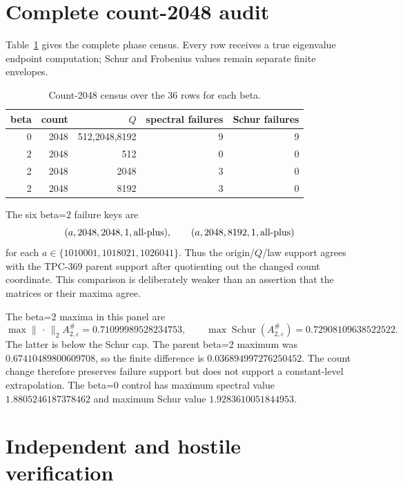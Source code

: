 \documentclass[10pt]{article}
\newcommand{\opnorm}{\lVert\,\cdot\,\rVert_2}
\begin{document}
\section{Complete count-2048 audit}

Table~\ref{tab:phase} gives the complete phase census.  Every row receives a
true eigenvalue endpoint computation; Schur and Frobenius values remain
separate finite envelopes.

\begin{table}[t]
\centering
\caption{Count-2048 census over the 36 rows for each beta.}
\label{tab:phase}
\small
\begin{tabular}{r r r r r}
\toprule
beta & count & $Q$ & spectral failures & Schur failures\\
\midrule
0 & 2048 & 512,2048,8192 & 9 & 9\\
2 & 2048 & 512 & 0 & 0\\
2 & 2048 & 2048 & 3 & 0\\
2 & 2048 & 8192 & 3 & 0\\
\bottomrule
\end{tabular}
\end{table}

The six beta=2 failure keys are
\begin{equation*}
(a,2048,2048,1,\mathrm{all\mathchar`-plus}),\qquad
(a,2048,8192,1,\mathrm{all\mathchar`-plus})
\end{equation*}
for each $a\in\{1010001,1018021,1026041\}$.  Thus the origin/$Q$/law
support agrees with the TPC-369 parent support after quotienting out the
changed count coordinate.  This comparison is deliberately weaker than an
assertion that the matrices or their maxima agree.

The beta=2 maxima in this panel are
\begin{equation*}
\max\opnorm{A^{\#}_{2,\varepsilon}}=0.71099989528234753,
\qquad
\max\operatorname{Schur}(A^{\#}_{2,\varepsilon})=0.72908109638522522.
\end{equation*}
The latter is below the Schur cap.  The parent beta=2 maximum was
$0.67410489800609708$, so the finite difference is
$0.036894997276250452$.  The count change therefore preserves failure support
but does not support a constant-level extrapolation.  The beta=0 control has
maximum spectral value $1.8805246187378462$ and maximum Schur value
$1.9283610051844953$.

\section{Independent and hostile verification}
\end{document}
